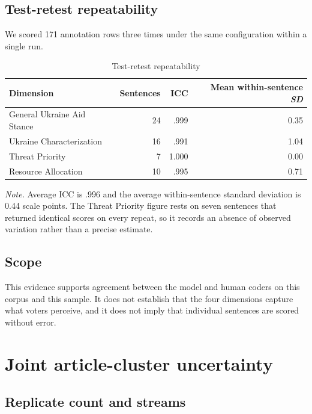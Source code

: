 \subsection*{Test-retest repeatability}

We scored 171 annotation rows three times under the same configuration within a single run.

\begin{table}[htbp]
\centering\small
\caption{Test-retest repeatability}
\begin{tabular}{@{}p{}rrr@{}}
\toprule
\textbf{Dimension} & \textbf{Sentences} & \textbf{ICC} & \textbf{Mean within-sentence \textit{SD}} \\
\midrule
General Ukraine Aid Stance & 24 & .999 & 0.35 \\
Ukraine Characterization & 16 & .991 & 1.04 \\
Threat Priority & 7 & 1.000 & 0.00 \\
Resource Allocation & 10 & .995 & 0.71 \\
\bottomrule
\end{tabular}
\begin{minipage}{\textwidth}\footnotesize \textit{Note.} Average ICC is .996 and the average within-sentence standard deviation is 0.44 scale points. The Threat Priority figure rests on seven sentences that returned identical scores on every repeat, so it records an absence of observed variation rather than a precise estimate.\end{minipage}
\end{table}

\subsection*{Scope}

This evidence supports agreement between the model and human coders on this corpus and this sample. It does not establish that the four dimensions capture what voters perceive, and it does not imply that individual sentences are scored without error.

\section{Joint article-cluster uncertainty}

\subsection*{Replicate count and streams}

